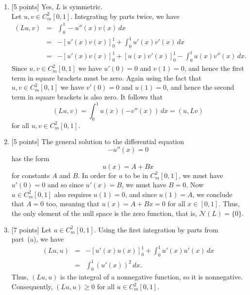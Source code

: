 \begin{solution}
\begin{enumerate}
\item {[5 points]} Yes, $L$ is symmetric.\\
      Let $u,v \in C_m^2[0,1]$. Integrating by parts twice, we have
       \begin{eqnarray*}
        (Lu, v) &=& \int_0^1 -u''(x) v(x)\, dx  \\[0.5em]
                &=& -[u'(x) v(x)]_0^1 + \int_0^1 u'(x) v'(x)\, dx \\[0.5em]
                &=& -[u'(x) v(x)]_0^1 + [u(x) v'(x)]_0^1 - \int_0^1 u(x) v''(x)\, dx.
       \end{eqnarray*}
       Since $u, v\in C_m^2[0,1]$ we have $u'(0)=0$ and $v(1) = 0$, and hence
       the first term in square brackets must be zero.  
       Again using the fact that $u, v\in C_m^2[0,1]$ we have $v'(0)=0$ and $u(1) = 0$,  
       and hence the second term in square brackets is also zero.  
       It follows that
\[
(L u, v) = \int_0^1 u(x) (-v''(x))\, dx = (u, L v)
\]
for all $u, v\in C_m^2[0,1]$.
\\
\item {[5 points]} The general solution to the differential equation 
          \[ -u''(x) = 0\]
        has the form
          \[ u(x) = A + B x\]
        for constants $A$ and $B$. In order for $u$ to be in $C_m^2[0,1]$, we must have $u'(0)=0$ and so
        since $u'(x) = B$, we must have $B=0$.  Now $u\in C_m^2[0,1]$ also requires
        $u(1) = 0$, and since $u(1)=A$, we conclude that $A=0$ too, meaning that
        $u(x) = A+Bx = 0$ for all $x\in[0,1]$.  
        Thus, the only element of the null space is the zero function,
        that is, $\mathcal{N}(L) = \{0\}$.

\item {[7 points]} Let $u\in C_m^2[0,1]$.
        Using the first integration by parts from part~(a), we have
          \begin{eqnarray*}
               (L u, u) &=&  -[u'(x) u(x)]_0^1 + \int_0^1 u'(x) u'(x)\, dx \\[0.5em]
                          &=&  \int_0^1 (u'(x))^2\, dx.
          \end{eqnarray*}
         Thus, $(L u, u)$ is the integral of a nonnegative function, so it is nonnegative. Consequently, $(L u, u)\ge0$ for all $u\in C_m^2[0,1]$.


\end{enumerate}
\end{solution}
